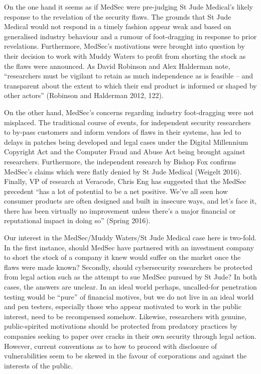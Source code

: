 \documentclass{svjour3}                     %
\begin{document}
On the one hand it seems as if MedSec were pre-judging St Jude Medical’s likely response to the revelation of the security flaws. The grounds that St Jude Medical would not respond in a timely fashion appear weak and based on generalised industry behaviour and a rumour of foot-dragging in response to prior revelations. Furthermore, MedSec’s motivations were brought into question by their decision to work with Muddy Waters to profit from shorting the stock as the flaws were announced. As David Robinson and Alex Halderman note, “researchers must be vigilant to retain as much independence as is feasible – and transparent about the extent to which their end product is informed or shaped by other actors” (Robinson and Halderman 2012, 122). 

On the other hand, MedSec’s concerns regarding industry foot-dragging were not misplaced. The traditional course of events, for independent security researchers to by-pass customers and inform vendors of flaws in their systems, has led to delays in patches being developed and legal cases under the Digital Millennium Copyright Act and the Computer Fraud and Abuse Act being brought against researchers. Furthermore, the independent research by Bishop Fox confirms MedSec’s claims which were flatly denied by St Jude Medical (Weigelt 2016). Finally, VP of research at Veracode, Chris Eng has suggested that the MedSec precedent “has a lot of potential to be a net positive. We’ve all seen how consumer products are often designed and built in insecure ways, and let’s face it, there has been virtually no improvement unless there’s a major financial or reputational impact in doing so” (Spring 2016).

Our interest in the MedSec/Muddy Waters/St Jude Medical case here is two-fold. In the first instance, should MedSec have partnered with an investment company to short the stock of a company it knew would suffer on the market once the flaws were made known? Secondly, should cybersecurity researchers be protected from legal action such as the attempt to sue MedSec pursued by St Jude? In both cases, the answers are unclear. In an ideal world perhaps, uncalled-for penetration testing would be “pure” of financial motives, but we do not live in an ideal world and pen testers, especially those who appear motivated to work in the public interest, need to be recompensed somehow. Likewise, researchers with genuine, public-spirited motivations should be protected from predatory practices by companies seeking to paper over cracks in their own security through legal action. However, current conventions as to how to proceed with disclosure of vulnerabilities seem to be skewed in the favour of corporations and against the interests of the public. 
\end{document}
